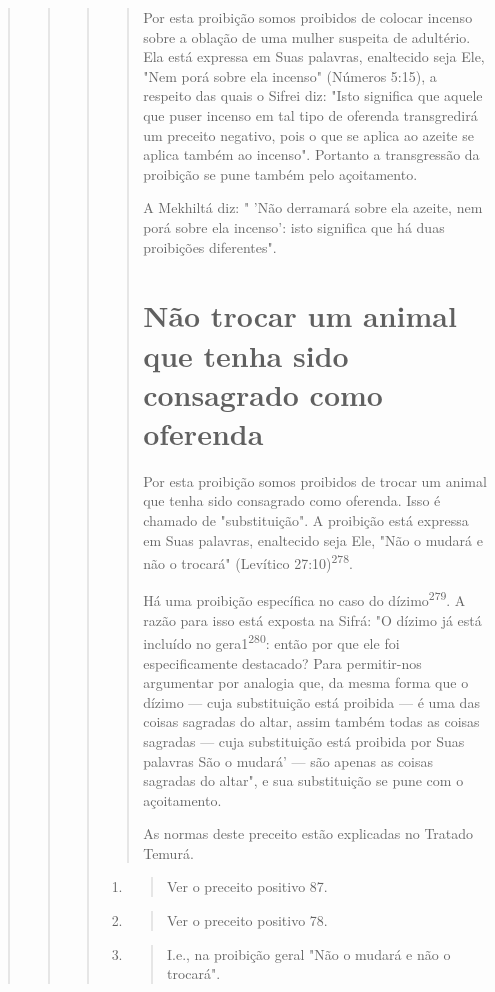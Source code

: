 \begin{quote}
\begin{quote}
\begin{quote}
\begin{quote}
Por esta proibição somos proibidos de colocar incenso sobre a obla­ção
de uma mulher suspeita de adultério. Ela está expressa em Suas palavras,
enaltecido seja Ele, "Nem porá sobre ela incenso" (Números 5:15), a
respeito das quais o Sifrei diz: "Isto significa que aquele que puser
incenso em tal tipo de oferenda transgredirá um preceito negativo, pois
o que se aplica ao azeite se aplica também ao incenso". Portanto a
transgressão da proibição se pune também pelo açoitamento.

A Mekhiltá diz: " 'Não derramará sobre ela azeite, nem porá sobre ela
incenso': isto significa que há duas proibições diferentes".

\section{Não trocar um animal que tenha sido consagrado como oferenda}

Por esta proibição somos proibidos de trocar um animal que tenha sido
consagrado como oferenda. Isso é chamado de "substituição". A proibi­ção
está expressa em Suas palavras, enaltecido seja Ele, "Não o mudará e não
o trocará" (Levítico 27:10)\textsuperscript{278}.

Há uma proibição específica no caso do dízimo\textsuperscript{279}. A
razão para is­so está exposta na Sifrá: "O dízimo já está incluído no
gera1\textsuperscript{280}: então por que ele foi especificamente
destacado? Para permitir-nos argumentar por analogia que, da mesma forma
que o dízimo --- cuja substituição está proibida --- é uma das coisas
sagradas do altar, assim também todas as coisas sagradas --- cuja
subs­tituição está proibida por Suas palavras São o mudará' --- são
apenas as coisas sagradas do altar", e sua substituição se pune com o
açoitamento.

As normas deste preceito estão explicadas no Tratado Temurá.
\end{quote}

\begin{enumerate}
\def\labelenumi{\arabic{enumi}.}
\setcounter{enumi}{277}
\item
 \begin{quote}
 Ver o preceito positivo 87.
 \end{quote}
\item
 \begin{quote}
 Ver o preceito positivo 78.
 \end{quote}
\item
 \begin{quote}
 I.e., na proibição geral "Não o mudará e não o trocará".
 \end{quote}
\end{enumerate}


\end{quote}
\end{quote}
\end{quote}
